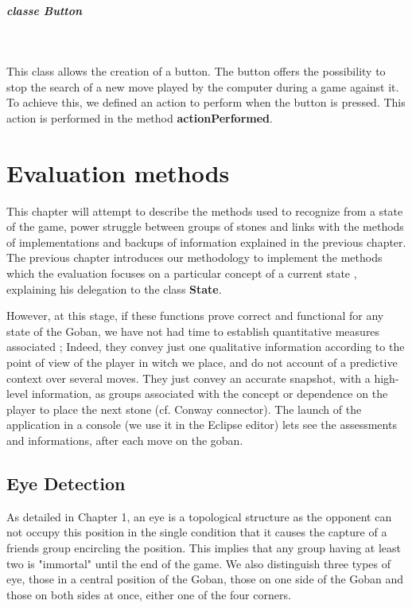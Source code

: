 \documentclass[a4paper,10pt,twoside]{report}
\begin{document}
	
	\paragraph{classe Button}
	~~\vspace{2mm}

	This class allows the creation of a button. The button offers the possibility to stop the search of a new move played by the computer during a game against it. To achieve this, we defined an action to perform when the button is pressed. This action is performed in the method \textbf{actionPerformed}.


\chapter{Evaluation methods}


	This chapter will attempt to describe the methods used to recognize from a state of the game, power struggle between groups of stones and links with the methods of implementations and backups of information explained in the previous chapter.\\

	The previous chapter introduces our methodology to implement the methods which the evaluation focuses on a particular concept of a current state , explaining his delegation to the class \textbf{State}.

	However, at this stage, if these functions prove correct and functional for any state of the Goban, we have not had time to establish quantitative measures associated ; Indeed, they convey just one qualitative information according to the point of view of the player in witch we place, and do not account of a predictive context over several moves. They just convey an accurate snapshot, with a high-level information, as groups associated with the concept or dependence on the player to place the next stone (cf. Conway connector). The launch of the application in a console (we use it in the Eclipse editor) lets see the assessments and informations, after each move on the goban.

	\section{Eye Detection} 
	\vspace{4mm}

	As detailed in Chapter 1, an eye is a topological structure as the opponent can not occupy this position in the single condition that it causes the capture of a friends group encircling the position. This implies that any group having at least two is "immortal" until the end of the game. We also distinguish three types of eye, those in a central position of the Goban, those on one side of the Goban and those on both sides at once, either one of the four corners.\\
\end{document}

